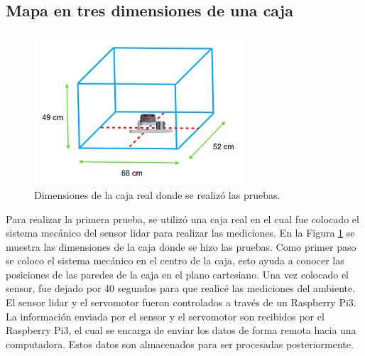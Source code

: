 \subsection{Mapa en tres dimensiones de una caja}
\label{sec:MapaCaja}
\begin{figure}
  \centering \footnotesize
  \includegraphics[width=0.70\textwidth]{images/caja_lidar3D.png}
  \captionsetup{font=footnotesize}
  \caption{Dimensiones de la caja real donde se realizó las pruebas.}
  \label{fig:dim_cajaReal}
\end{figure}

Para realizar la primera prueba, se utilizó una caja real en el cual fue colocado 
el sistema mecánico del sensor lidar para realizar las mediciones. En la Figura 
\ref{fig:dim_cajaReal} se muestra las dimensiones de la caja donde se hizo las 
pruebas. Como primer paso se coloco el sistema mecánico en el centro de la caja, esto
ayuda a conocer las posiciones de las paredes de la caja en el plano cartesiano. Una 
vez colocado el sensor, fue dejado por 40 segundos para que realicé las mediciones del 
ambiente. El sensor lidar y el servomotor fueron controlados a través de un Raspberry 
Pi3. La información enviada por el sensor y el servomotor son recibidos por el Raspberry 
Pi3, el cual se encarga de enviar los datos de forma remota hacia una computadora. Estos 
datos son almacenados para ser procesadas posteriormente.

